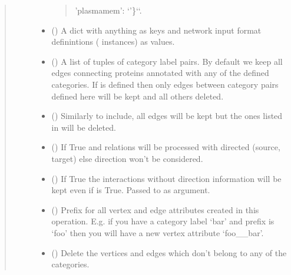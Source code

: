 \documentclass[letterpaper,10pt,english]{sphinxmanual}
\begin{document}
\begin{fulllineitems}
\begin{fulllineitems}
\begin{quote}
\begin{description}
\begin{itemize}
\begin{quote}
’plasmamem’: ‘’\}{}`{}`.
\end{quote}


\item {} 
 () \textendash{} A dict with anything as keys and network input format definintions
( instances) as values.

\item {} 
 () \textendash{} A list of tuples of category label pairs. By default we keep all
edges connecting proteins annotated with any of the defined
categories. If  is defined then only edges between
category pairs defined here will be kept and all others deleted.

\item {} 
 () \textendash{} Similarly to include, all edges will be kept but the ones listed
in  will be deleted.

\item {} 
 () \textendash{} If True  and  relations will be processed
with directed (source, target) else direction won’t be considered.

\item {} 
 () \textendash{} If True the interactions without direction information will be
kept even if  is True. Passed to 
as  argument.

\item {} 
 () \textendash{} Prefix for all vertex and edge attributes created in this
operation. E.g. if you have a category label ‘bar’ and prefix
is ‘foo’ then you will have a new vertex attribute ‘foo\_\_bar’.

\item {} 
 () \textendash{} Delete the vertices and edges which don’t belong to any of the
categories.


\end{itemize}
\end{description}
\end{quote}
\end{fulllineitems}
\end{fulllineitems}
\end{document}
